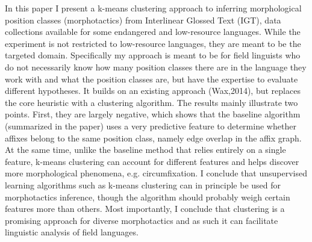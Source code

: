 In this paper I present a k-means clustering approach to inferring morphological position classes (morphotactics) from Interlinear Glossed Text (IGT), data collections available for some endangered and low-resource languages. While the experiment is not restricted to low-resource languages, they are meant to be the targeted domain. Specifically my approach is meant to be for field linguists who do not necessarily know how many position classes there are in the language they work with and what the position classes are, but have the expertise to evaluate different hypotheses. It builds on an existing approach (Wax,2014), but replaces the core heuristic with a clustering algorithm. The results mainly illustrate two points. First, they are largely negative, which shows that the baseline algorithm (summarized in the paper) uses a very predictive feature to determine whether affixes belong to the same position class, namely edge overlap in the affix graph. At the same time, unlike the baseline method that relies entirely on a single feature, k-means clustering can account for different features and helps discover more morphological phenomena, e.g. circumfixation. I conclude that unsupervised learning algorithms such as k-means clustering can in principle be used for morphotactics inference, though the algorithm should probably weigh certain features more than others. Most importantly, I conclude that clustering is a promising approach for diverse morphotactics and as such it can facilitate linguistic analysis of field languages.

